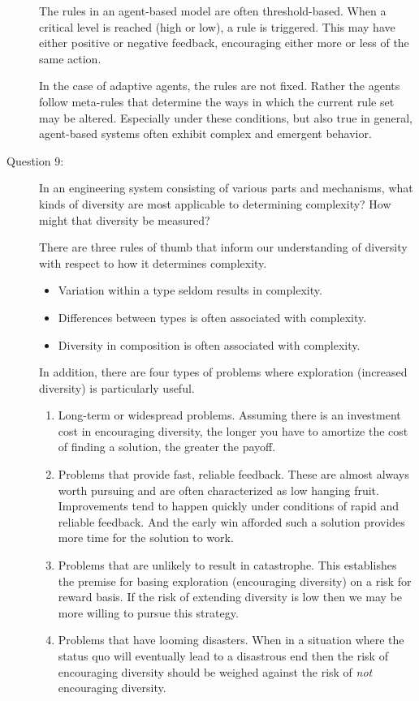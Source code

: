 \documentclass[letterpaper,10pt]{article}
\begin{document}
\begin{description}
The rules in an agent-based model are often threshold-based.  When a critical level is reached (high or low), a rule is triggered.  This may have either positive or negative feedback, encouraging either more or less of the same action.

In the case of adaptive agents, the rules are not fixed.  Rather the agents follow meta-rules that determine the ways in which the current rule set may be altered.  Especially under these conditions, but also true in general, agent-based systems often exhibit complex and emergent behavior.

\item[Question 9:]
In an engineering system consisting of various parts and mechanisms, what kinds of diversity are most applicable to determining complexity?  How might that diversity be measured?

There are three rules of thumb that inform our understanding of diversity with respect to how it determines complexity.
\begin{itemize}
  \item Variation within a type seldom results in complexity.
  \item Differences between types is often associated with complexity.
  \item Diversity in composition is often associated with complexity.
\end{itemize}

In addition, there are four types of problems where exploration (increased diversity) is particularly useful.
\begin{enumerate}
  \item Long-term or widespread problems.  Assuming there is an investment cost in encouraging diversity, the longer you have to amortize the cost of finding a solution, the greater the payoff.
  \item Problems that provide fast, reliable feedback.  These are almost always worth pursuing and are often characterized as low hanging fruit.  Improvements tend to happen quickly under conditions of rapid and reliable feedback.  And the early win afforded such a solution provides more time for the solution to work.
  \item Problems that are unlikely to result in catastrophe.  This establishes the premise for basing exploration (encouraging diversity) on a risk for reward basis.  If the risk of extending diversity is low then we may be more willing to pursue this strategy.
  \item Problems that have looming disasters. When in a situation where the status quo will eventually lead to a disastrous end then the risk of encouraging diversity should be weighed against the risk of \emph{not} encouraging diversity.
\end{enumerate}


\end{description}
\end{document}
